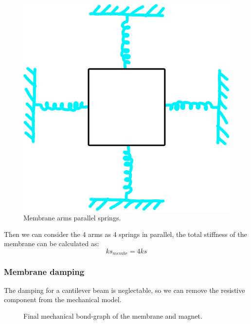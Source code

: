 \begin{figure}
    \centering
    \includegraphics[scale=0.4]{Chapters/Chapter2/Modelling_of_Entire_System/Figures/4_arms_springs.png} %
    \caption{Membrane arms parallel springs.}
    \label{fig: Membrane springs}
\end{figure}
Then we can consider the 4 arms as 4 springs in parallel, the total stiffness of the membrane can be calculated as:
\begin{equation}
    ks_{membr} = 4 ks
\end{equation}


\subsubsection{Membrane damping}
The damping for a cantilever beam is neglectable, so we can remove the resistive component from the mechanical model.
\begin{figure}
    \centering
    \resizebox{.9\linewidth}{!}{
            
    }
    \caption{Final mechanical bond-graph of the membrane and magnet.}
    \label{fig: Membrane bond graph without damping}
\end{figure}

